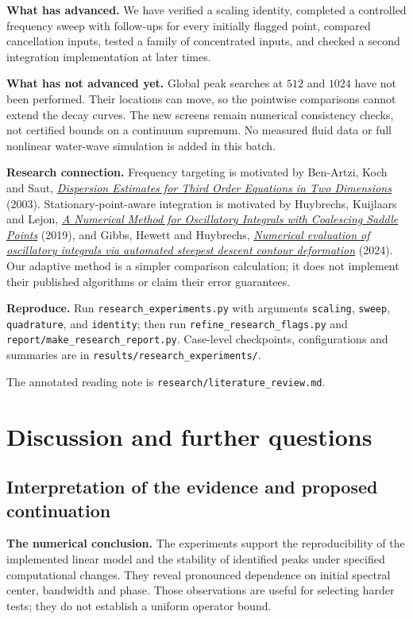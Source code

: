 \documentclass[10pt,letterpaper]{article}
\numberwithin{equation}{section}
\begin{document}
\textbf{What has advanced.} We have verified a scaling identity, completed a
controlled frequency sweep with follow-ups for every initially flagged point,
compared cancellation inputs, tested a family of concentrated inputs, and checked
a second integration implementation at later times.

\textbf{What has not advanced yet.} Global peak searches at $512$ and $1024$
have not been performed. Their locations can move, so the pointwise comparisons
cannot extend the decay curves. The new screens remain numerical consistency
checks, not certified bounds on a continuum supremum. No measured fluid data or
full nonlinear water-wave simulation is added in this batch.

\textbf{Research connection.} Frequency targeting is motivated by Ben-Artzi,
Koch and Saut, \href{https://doi.org/10.1081/PDE-120025491}{\emph{Dispersion Estimates
for Third Order Equations in Two Dimensions}} (2003). Stationary-point-aware
integration is motivated by Huybrechs, Kuijlaars and Lejon,
\href{https://arxiv.org/abs/1806.06549}{\emph{A Numerical Method for Oscillatory
Integrals with Coalescing Saddle Points}} (2019), and Gibbs, Hewett and Huybrechs,
\href{https://arxiv.org/abs/2307.07261}{\emph{Numerical evaluation of oscillatory
integrals via automated steepest descent contour deformation}} (2024).
Our adaptive method is a simpler comparison calculation; it does not implement
their published algorithms or claim their error guarantees.

\textbf{Reproduce.} Run \texttt{research\_experiments.py} with arguments
\texttt{scaling}, \texttt{sweep}, \texttt{quadrature}, and \texttt{identity}; then
run \texttt{refine\_research\_flags.py} and \texttt{report/make\_research\_report.py}.
Case-level checkpoints, configurations and summaries are in
\texttt{results/research\_experiments/}. \par The annotated reading note is \texttt{research/literature\_review.md}.

\section{Discussion and further questions}

\subsection{Interpretation of the evidence and proposed continuation}\label{discussion}
\textbf{The numerical conclusion.} The experiments support the reproducibility
of the implemented linear model and the stability of identified peaks under
specified computational changes. They reveal pronounced dependence on initial
spectral center, bandwidth and phase. Those observations are useful for selecting
harder tests; they do not establish a uniform operator bound.
\end{document}
